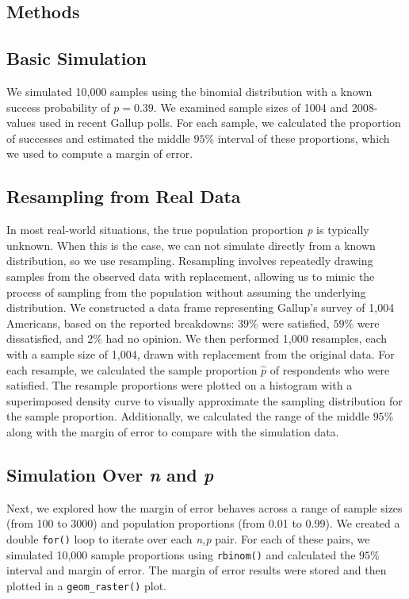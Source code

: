 \documentclass{article}\usepackage[]{graphicx}\usepackage[]{xcolor}
\begin{document}
\begin{multicols}{2}
\section{Methods}
\subsection{Basic Simulation}
We simulated 10,000 samples using the binomial distribution with a known success
probability of $p=0.39$. We examined sample sizes of 1004 and 2008- values used 
in recent Gallup polls. For each sample, we calculated the proportion of successes
and estimated the middle $95\%$ interval of these proportions, which we used to
compute a margin of error.

\subsection{Resampling from Real Data}
In most real-world situations, the true population proportion \textit{p} is typically unknown. When this is the case, we can not simulate directly from a known distribution,
so we use resampling. Resampling involves repeatedly drawing samples
from the observed data with replacement, allowing us to mimic the process of 
sampling from the population without assuming the underlying distribution. We 
constructed a data frame representing Gallup's survey of 1,004 Americans, 
based on the reported breakdowns: $39\%$ were satisfied, $59\%$ were dissatisfied, 
and $2\%$ had no opinion. We then performed 1,000 resamples, each with a sample
size of 1,004, drawn with replacement from the original data. For each resample,
we calculated the sample proportion $\hat{p}$ of respondents who were satisfied. 
The resample proportions were plotted on a histogram with a superimposed density
curve to visually approximate the sampling distribution for the sample proportion.
Additionally, we calculated the range of the middle $95\%$ along with the margin
of error to compare with the simulation data.

\subsection{Simulation Over \textit{n} and \textit{p}}
Next, we explored how the margin of error behaves across a range of sample
sizes (from 100 to 3000) and population proportions (from 0.01 to 0.99). We
created a double \texttt{for()} loop to iterate over each \textit{n,p} pair. For
each of these pairs, we simulated 10,000 sample proportions using 
\texttt{rbinom()} and calculated the $95\%$ interval and margin of error. The
margin of error results were stored and then plotted in a \texttt{geom\_raster()}
plot. 


\end{multicols}
\end{document}
